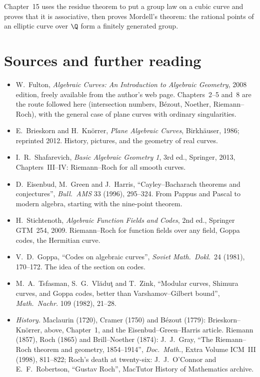 Chapter~15 uses the residue theorem to put a group law on a cubic curve and proves that it is associative, then proves Mordell's
theorem: the rational points of an elliptic curve over $\Q$ form a finitely generated group.

\section*{Sources and further reading}

\begin{itemize}
\item W.~Fulton, \emph{Algebraic Curves: An Introduction to Algebraic Geometry}, 2008 edition, freely available from the author's web page. Chapters~2--5 and~8
are the route followed here (intersection numbers, B\'ezout, Noether, Riemann--Roch), with the general case of plane curves with ordinary singularities.
\item E.~Brieskorn and H.~Kn\"orrer, \emph{Plane Algebraic Curves}, Birkh\"auser, 1986; reprinted 2012. History, pictures, and the geometry of real curves.
\item I.~R.~Shafarevich, \emph{Basic Algebraic Geometry 1}, 3rd ed., Springer, 2013, Chapters~III--IV: Riemann--Roch for all smooth curves.
\item D.~Eisenbud, M.~Green and J.~Harris, ``Cayley--Bacharach theorems and conjectures'', \emph{Bull.\ AMS} 33 (1996), 295--324. From Pappus and Pascal to modern
algebra, starting with the nine-point theorem.
\item H.~Stichtenoth, \emph{Algebraic Function Fields and Codes}, 2nd ed., Springer GTM~254, 2009. Riemann--Roch for function fields over any field, Goppa
codes, the Hermitian curve.
\item V.~D.~Goppa, ``Codes on algebraic curves'', \emph{Soviet Math.\ Dokl.}\ 24 (1981), 170--172. The idea of the section on codes.
\item M.~A.~Tsfasman, S.~G.~Vl\u{a}du\c{t} and T.~Zink, ``Modular curves, Shimura curves, and Goppa codes, better than Varshamov--Gilbert bound'',
\emph{Math.\ Nachr.} 109 (1982), 21--28.
\item \emph{History.} Maclaurin (1720), Cramer (1750) and B\'ezout (1779): Brieskorn--Kn\"orrer, above, Chapter~1, and
the Eisenbud--Green--Harris article. Riemann (1857), Roch (1865) and Brill--Noether (1874): J.~J.~Gray, ``The
Riemann--Roch theorem and geometry, 1854--1914'', \emph{Doc.\ Math.}, Extra Volume ICM~III (1998), 811--822; Roch's
death at twenty-six: J.~J.~O'Connor and E.~F.~Robertson, ``Gustav Roch'', MacTutor History of Mathematics archive.
\end{itemize}
